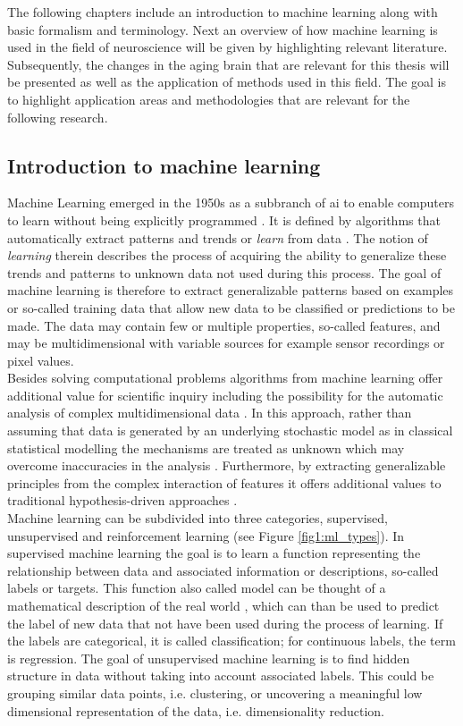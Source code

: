The following chapters include an introduction to machine learning along with basic formalism and terminology. Next an overview of how machine learning is used in the field of neuroscience will be given by highlighting relevant literature. Subsequently, the changes in the aging brain that are relevant for this thesis will be presented as well as the application of methods used in this field. The goal is to highlight application areas and methodologies that are relevant for the following research. 

\subsection{Introduction to machine learning}
\label{subsec:ML}
Machine Learning emerged in the 1950s as a subbranch of \gls{ai} to enable computers to learn without being explicitly programmed \cite{Samual1959}. It is defined by algorithms that automatically extract patterns and trends or \textit{learn} from data \cite{Hastie2009}. The notion of \textit{learning} therein describes the process of acquiring the ability to generalize these trends and patterns to unknown data not used during this process. The goal of machine learning is therefore to extract generalizable patterns based on examples or so-called training data that allow new data to be classified or predictions to be made. The data may contain few or multiple properties, so-called features, and may be multidimensional with variable sources for example sensor recordings or pixel values.\\ 
Besides solving computational problems algorithms from machine learning offer additional value for scientific inquiry including the possibility for the automatic analysis of complex multidimensional data \cite{Brunton2019,Breiman2001}. In this approach, rather than assuming that data is generated by an underlying stochastic model as in classical statistical modelling the mechanisms are treated as unknown which may overcome inaccuracies in the analysis \cite{Breiman2001}. Furthermore, by extracting generalizable principles from the complex interaction of features it offers additional values to traditional hypothesis-driven approaches \cite{Vu1601,Bzdok2017}. \medskip\\
Machine learning can be subdivided into three categories, supervised, unsupervised and reinforcement learning (see Figure \ref{fig1:ml_types}). In supervised machine learning the goal is to learn a function representing the relationship between data and associated information or descriptions, so-called labels or targets. This function also called model can be thought of a mathematical description of the real world \cite{Brunton2019}, which can than be used to predict the label of new data that not have been used during the process of learning. If the labels are categorical, it is called classification; for continuous labels, the term is regression. The goal of unsupervised machine learning is to find hidden structure in data without taking into account associated labels. This could be grouping similar data points, i.e. clustering, or uncovering a meaningful low dimensional representation of the data, i.e. dimensionality reduction. 

